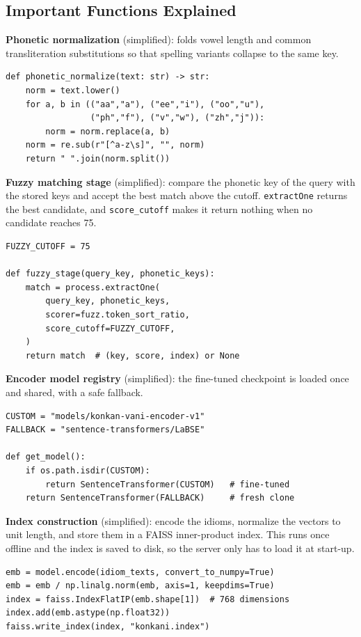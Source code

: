 \documentclass[12pt,a4paper]{article}
\begin{document}
\subsection{Important Functions Explained}

\textbf{Phonetic normalization} (simplified): folds vowel length and common transliteration substitutions so that spelling variants collapse to the same key.
\begin{lstlisting}
def phonetic_normalize(text: str) -> str:
    norm = text.lower()
    for a, b in (("aa","a"), ("ee","i"), ("oo","u"),
                 ("ph","f"), ("v","w"), ("zh","j")):
        norm = norm.replace(a, b)
    norm = re.sub(r"[^a-z\s]", "", norm)
    return " ".join(norm.split())
\end{lstlisting}

\textbf{Fuzzy matching stage} (simplified): compare the phonetic key of the query with the stored keys and accept the best match above the cutoff. \texttt{extractOne} returns the best candidate, and \texttt{score\_cutoff} makes it return nothing when no candidate reaches 75.
\begin{lstlisting}
FUZZY_CUTOFF = 75

def fuzzy_stage(query_key, phonetic_keys):
    match = process.extractOne(
        query_key, phonetic_keys,
        scorer=fuzz.token_sort_ratio,
        score_cutoff=FUZZY_CUTOFF,
    )
    return match  # (key, score, index) or None
\end{lstlisting}

\textbf{Encoder model registry} (simplified): the fine-tuned checkpoint is loaded once and shared, with a safe fallback.
\begin{lstlisting}
CUSTOM = "models/konkan-vani-encoder-v1"
FALLBACK = "sentence-transformers/LaBSE"

def get_model():
    if os.path.isdir(CUSTOM):
        return SentenceTransformer(CUSTOM)   # fine-tuned
    return SentenceTransformer(FALLBACK)     # fresh clone
\end{lstlisting}

\textbf{Index construction} (simplified): encode the idioms, normalize the vectors to unit length, and store them in a FAISS inner-product index. This runs once offline and the index is saved to disk, so the server only has to load it at start-up.
\begin{lstlisting}
emb = model.encode(idiom_texts, convert_to_numpy=True)
emb = emb / np.linalg.norm(emb, axis=1, keepdims=True)
index = faiss.IndexFlatIP(emb.shape[1])  # 768 dimensions
index.add(emb.astype(np.float32))
faiss.write_index(index, "konkani.index")
\end{lstlisting}
\end{document}
